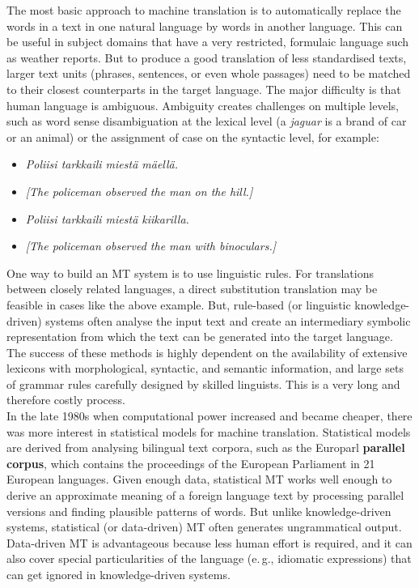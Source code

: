 \begin{multicols}{2}
The most basic approach to machine translation is to automatically replace the
words in a text in one natural language by words in another language. This can
be useful in subject domains that have a very restricted, formulaic language
such as weather reports. But to produce a good translation of less standardised
texts, larger text units (phrases, sentences, or even whole passages) need to
be matched to their closest counterparts in the target language. The major
difficulty is that human language is ambiguous. Ambiguity creates challenges on
multiple levels, such as word sense disambiguation at the lexical level (a
\textit{jaguar} is a brand of car or an animal) or the assignment of case on the
syntactic level, for example:
\begin{itemize}
\item[] {\foreignlanguage{finnish}
         {\textit{Poliisi tarkkaili miestä mäellä.}}} 
\item        \textit{[The policeman observed the man on the hill.]}

\item[] {\foreignlanguage{finnish}{\textit{Poliisi tarkkaili miestä
                kiikarilla.}}} 
\item        \textit{[The policeman observed the man with binoculars.]}
\end{itemize}
One way to build an MT system is to use linguistic rules. For translations
between closely related languages, a direct substitution translation may be
feasible in cases like the above example. But, rule-based (or linguistic
knowledge-driven) systems often analyse the input text and create an
intermediary symbolic representation from which the text can be generated into
the target language. The success of these methods is highly dependent on the
availability of extensive lexicons with morphological, syntactic, and semantic
information, and large sets of grammar rules carefully designed by skilled
linguists. This is a very long and therefore costly process.\\
In the late 1980s when computational power increased and became cheaper, there
was more interest in statistical models for machine translation. Statistical
models are derived from analysing bilingual text corpora, such as the Europarl
\textbf{parallel corpus}, which contains the proceedings of the European Parliament in
21 European languages. Given enough data, statistical MT works well enough to
derive an approximate meaning of a foreign language text by processing parallel
versions and finding plausible patterns of words. But unlike knowledge-driven
systems, statistical (or data-driven) MT often generates ungrammatical output.
Data-driven MT is advantageous because less human effort is required, and it
can also cover special particularities of the language (e.\,g., idiomatic
expressions) that can get ignored in knowledge-driven systems.


\end{multicols}
